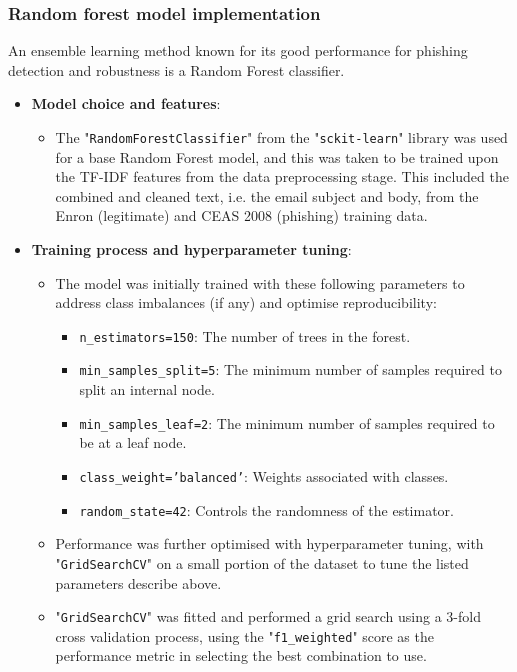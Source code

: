 
\subsubsection*{Random forest model implementation}
An ensemble learning method known for its good performance for phishing detection and robustness \citep{gupta2021novel} is a Random Forest classifier.

\begin{itemize}
  \item \textbf{Model choice and features}:
  \begin{itemize}
    \item The "\texttt{RandomForestClassifier}" from the "\texttt{sckit-learn}" library was used for a base Random Forest model, and this was taken to be trained upon the TF-IDF features from the data preprocessing stage. This included the combined and cleaned text, i.e. the email subject and body, from the Enron (legitimate) and CEAS 2008 (phishing) training data.
  \end{itemize}
  \item \textbf{Training process and hyperparameter tuning}:
  \begin{itemize}
    \item The model was initially trained with these following parameters to address class imbalances (if any) and optimise reproducibility:
    \begin{itemize}
      \item \texttt{n\_estimators=150}: The number of trees in the forest.
      \item \texttt{min\_samples\_split=5}: The minimum number of samples required to split an internal node.
      \item \texttt{min\_samples\_leaf=2}: The minimum number of samples required to be at a leaf node.
      \item \texttt{class\_weight='balanced'}: Weights associated with classes.
      \item \texttt{random\_state=42}: Controls the randomness of the estimator.
    \end{itemize}
    \item Performance was further optimised with hyperparameter tuning, with "\texttt{GridSearchCV}" on a small portion of the dataset to tune the listed parameters describe above.
    \item "\texttt{GridSearchCV}" was fitted and performed a grid search using a 3-fold cross validation process, using the "\texttt{f1\_weighted}" score as the performance metric in selecting the best combination to use.
  \end{itemize}
\end{itemize}

